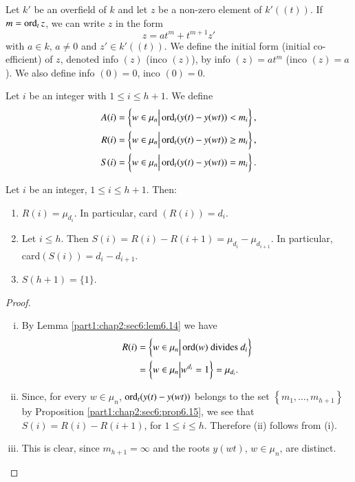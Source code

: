 \begin{defi}\label{part1:chap3:sec7:def7.3}
  Let $k'$ be an overfield of $k$ and let $z$ be a non-zero element of $k'((t))$. If $m= \operatorname{ord}_t z$, we can write $z$ in the form
$$
z= a t^m + t^{m+1} z'
$$
with $a\in k$, $a \neq 0$ and $z' \in k'((t))$. We define the {\rm initial form (\resp initial co-efficient)} of $z$, denoted info $(z)$ (\resp inco $(z)$), by info $(z)= at^m$ (\resp inco $(z)=a$). We also define info $(0) =0$, inco $(0)=0$. 
\end{defi}

\begin{defi}\label{part1:chap3:sec7:def7.4}
  Let $i$ be an integer with $1 \leq i \leq h+1$. We define
\begin{align*}
  A(i) & = \left\{ w \in \mu_n \Big| \operatorname{ord}_t (y(t)- y(wt)) < m_i \right\},\\
  R(i) & = \left\{ w \in \mu_n \Big| \operatorname{ord}_t (y(t)- y(wt)) \geq m_i \right\},\\
  S(i) & = \left\{ w \in \mu_n \Big| \operatorname{ord}_t (y(t)- y(wt)) = m_i \right\}.
\end{align*}
\end{defi}

\begin{lemma}\label{part1:chap3:sec7:lem7.5}
  Let $i$ be an integer, $1\leq i \leq h+1$. Then:
\begin{enumerate}[\rm (i)]
\item $R(i) = \mu_{d_i}$. In particular, card $(R(i))= d_i$.
\item Let $i \leq h$. Then $S(i)= R(i)- R(i+1)= \mu_{d_i}- \mu_{d_{i+1}}$. In particular, card\pageoriginale $(S(i))=d_i- d_{i+1}$.
\item $S(h+1)= \{ 1\}$.
\end{enumerate}
\end{lemma}

\begin{proof}
  ~
\begin{enumerate}[(i)]
\item By Lemma \ref{part1:chap2:sec6:lem6.14} we have
\begin{align*}
  R(i) & = \left\{ w \in \mu_n \Big| \operatorname{ord}(w) ~\text{divides}~ d_i \right\}\\
  & = \left\{ w \in \mu_n \Big| w^{d_i}=1\right\} = \mu_{d_i}.
\end{align*}
\item Since, for every $w \in \mu_n$, $\operatorname{ord}_t(y(t)- y(wt))$ belongs to
  the set $\left\{ m_1, \ldots , m_{h+1}\right\}$ by Proposition
  \ref{part1:chap2:sec6:prop6.15}, we see that $S(i) = R(i)- R(i+1)$,
  for $1 \leq i \leq h$. Therefore (ii) follows from (i). 
\item This is clear, since $m_{h+1}= \infty$ and the roots $y(wt)$, $w \in \mu_n$, are distinct. 
\end{enumerate}
\end{proof}

